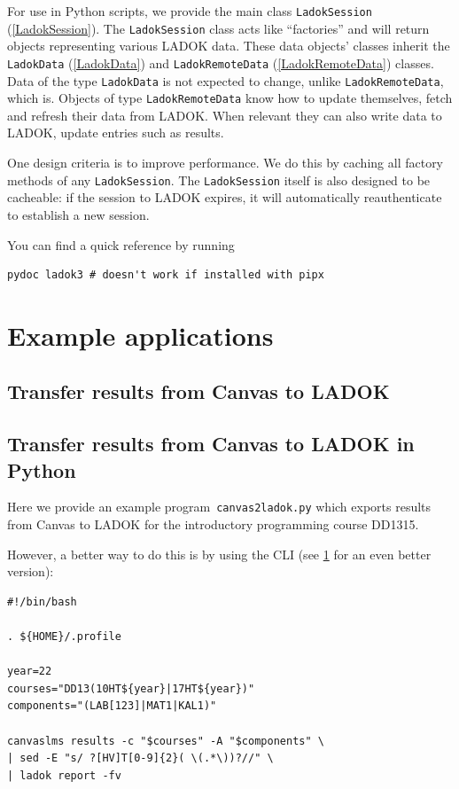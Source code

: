 \documentclass[a4paper,oneside]{memoir}
\begin{document}
For use in Python scripts,
we provide the main class \texttt{LadokSession} (\cref{LadokSession}).
The \texttt{LadokSession} class acts like \enquote{factories} and will return 
objects representing various LADOK data.
These data objects' classes inherit the \texttt{LadokData} (\cref{LadokData}) 
and \texttt{LadokRemoteData} (\cref{LadokRemoteData}) classes.
Data of the type \texttt{LadokData} is not expected to change, unlike 
\texttt{LadokRemoteData}, which is.
Objects of type \texttt{LadokRemoteData} know how to update themselves, \ie fetch 
and refresh their data from LADOK.
When relevant they can also write data to LADOK, \ie update entries such as 
results.

One design criteria is to improve performance.
We do this by caching all factory methods of any \texttt{LadokSession}.
The \texttt{LadokSession} itself is also designed to be cacheable: if the session to 
LADOK expires, it will automatically reauthenticate to establish a new session.

You can find a quick reference by running
\begin{verbatim}
pydoc ladok3 # doesn't work if installed with pipx
\end{verbatim}



\part{Example applications}

\chapter{Transfer results from Canvas to LADOK}\label{SomeScripts}



\chapter{Transfer results from Canvas to LADOK in Python}

Here we provide an example program~\texttt{canvas2ladok.py} which exports 
results from Canvas to LADOK for the introductory programming course DD1315.

However, a better way to do this is by using the CLI
(see \cref{SomeScripts} for an even better version):
\begin{verbatim}
#!/bin/bash

. ${HOME}/.profile

year=22
courses="DD13(10HT${year}|17HT${year})"
components="(LAB[123]|MAT1|KAL1)"

canvaslms results -c "$courses" -A "$components" \
| sed -E "s/ ?[HV]T[0-9]{2}( \(.*\))?//" \
| ladok report -fv
\end{verbatim}
\end{document}
